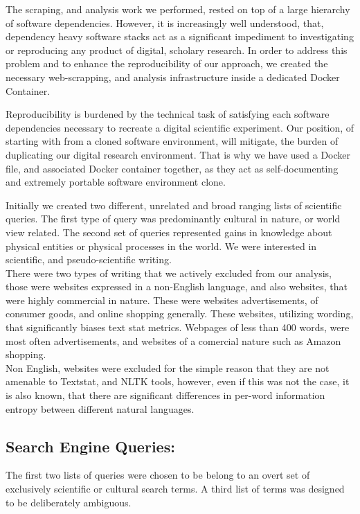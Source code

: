 \documentclass{clv3}
\begin{document}
The scraping, and analysis work we performed, rested on top of a large hierarchy of software dependencies. However, it is increasingly well understood, that, dependency heavy software stacks act as a significant impediment to investigating or reproducing any product of digital, scholary research. In order to address this problem and to enhance the reproducibility of our approach, we created the necessary web-scrapping, and analysis infrastructure inside a dedicated Docker Container.

Reproducibility is burdened by the technical task of satisfying each software dependencies necessary to recreate a digital scientific experiment. Our position, of starting with from a cloned software environment, will mitigate, the burden of duplicating our digital research environment. That is why we have used a Docker file, and associated Docker container together, as they act as self-documenting and extremely portable software environment clone.

Initially we created two different, unrelated and broad ranging lists of scientific queries. The first type of query was predominantly cultural in nature, or world view related. The second set of queries represented gains in knowledge about physical entities or physical processes in the world. We were interested in scientific, and pseudo-scientific writing.\\

There were two types of writing that we actively excluded from our analysis, those were websites expressed in a non-English language, and also websites, that were highly commercial in nature. These were websites advertisements, of consumer goods, and online shopping generally. These websites, utilizing wording, that significantly biases text stat metrics. Webpages of less than 400 words, were most often advertisements, and websites of a comercial nature such as Amazon shopping.\\

Non English, websites were excluded for the simple reason that they are not amenable to Textstat, and NLTK tools, however, even if this was not the case, it is also known, that there are  significant differences in per-word information entropy between different natural languages.

\subsection{Search Engine Queries:}
The first two lists of queries were chosen to be belong to an overt set of exclusively scientific or cultural search terms. A third list of terms was designed to be deliberately ambiguous.
\end{document}
